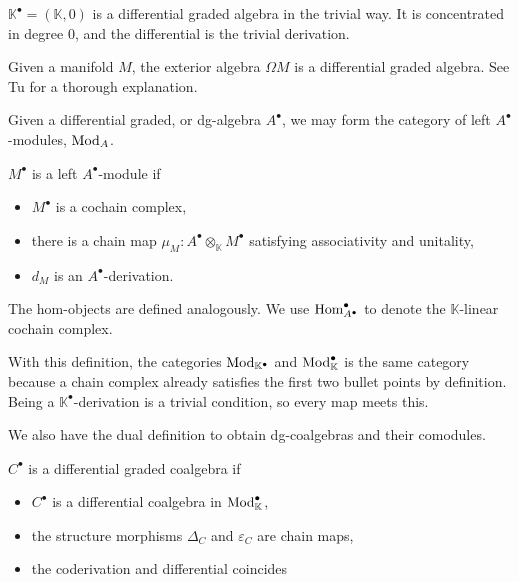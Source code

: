 \documentclass[../thesis.tex]{subfiles}
\begin{document}
            \begin{example}
                $\mathbb{K}^\bullet = (\mathbb{K},0)$ is a differential graded algebra in the trivial way. It is concentrated in degree $0$, and the differential is the trivial derivation.
            \end{example}
            \begin{example}
                Given a manifold $M$, the exterior algebra $\Omega M$ is a differential graded algebra. See Tu \cite{Tu07} for a thorough explanation.
            \end{example}

            Given a differential graded, or dg-algebra $A^\bullet$, we may form the category of left $A^\bullet$-modules, $\tt{Mod}_A$.
            \begin{definition}
                $M^\bullet$ is a left $A^\bullet$-module if
                \begin{itemize}
                    \item $M^\bullet$ is a cochain complex,
                    \item there is a chain map $\mu_M : A^\bullet\otimes_\mathbb{K} M^\bullet$ satisfying associativity and unitality,
                    \item $d_M$ is an $A^\bullet$-derivation.
                \end{itemize}
            \end{definition}
            The hom-objects are defined analogously. We use $\tt{Hom}_{A^\bullet}^\bullet$ to denote the $\mathbb{K}$-linear cochain complex.

            With this definition, the categories $\tt{Mod}_\mathbb{K^\bullet}$ and $\tt{Mod}_\mathbb{K}^\bullet$ is the same category because a chain complex already satisfies the first two bullet points by definition. Being a $\mathbb{K}^\bullet$-derivation is a trivial condition, so every map meets this.

            We also have the dual definition to obtain dg-coalgebras and their comodules.
            
            \begin{definition}
                $C^{\bullet}$ is a differential graded coalgebra if
                \begin{itemize}
                    \item $C^\bullet$ is a differential coalgebra in $\tt{Mod}_\mathbb{K}^\bullet$,
                    \item the structure morphisms $\Delta_C$ and $\varepsilon_C$ are chain maps,
                    \item the coderivation and differential coincides
                \end{itemize}
            \end{definition}
\end{document}
